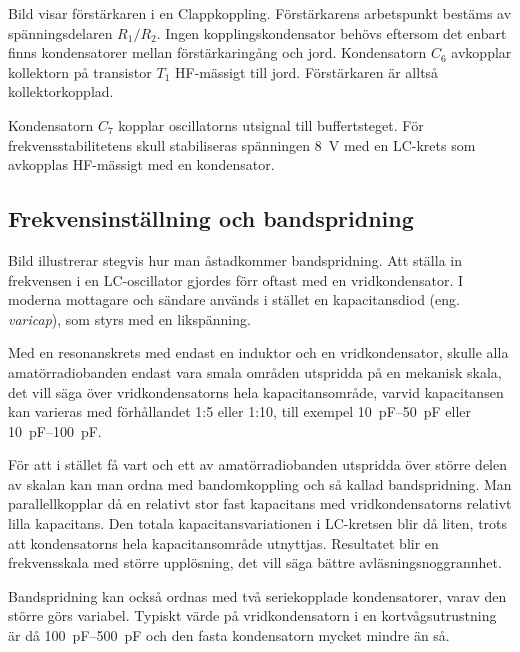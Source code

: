 \newpage
Bild  visar förstärkaren i en Clappkoppling.
Förstärkarens arbetspunkt bestäms av spänningsdelaren \(R_1/R_2\).
Ingen kopplingskondensator behövs eftersom det enbart finns kondensatorer
mellan förstärkaringång och jord.
Kondensatorn \(C_6\) avkopplar kollektorn på transistor \(T_1\) HF-mässigt till
jord.
Förstärkaren är alltså kollektorkopplad.

Kondensatorn \(C_7\) kopplar oscillatorns utsignal till buffertsteget.
För frekvensstabilitetens skull stabiliseras spänningen \qty{8}{\volt} med en
LC-krets som avkopplas HF-mässigt med en kondensator.

\subsection{Frekvensinställning och bandspridning}


Bild  illustrerar stegvis hur man åstadkommer
bandspridning.
Att ställa in frekvensen i en LC-oscillator gjordes förr oftast med en
vridkondensator.
I moderna mottagare och sändare används i stället en kapacitansdiod 
(eng. \emph{varicap}), som styrs med en likspänning.

Med en resonanskrets med endast en induktor och en vridkondensator, skulle
alla amatörradiobanden endast vara smala områden utspridda på en mekanisk
skala, det vill säga över vridkondensatorns hela kapacitansområde, varvid
kapacitansen kan varieras med förhållandet 1:5 eller 1:10, till exempel
\SIrange{10}{50}{\pico\farad} eller \SIrange{10}{100}{\pico\farad}.

För att i stället få vart och ett av amatörradiobanden utspridda över större
delen av skalan kan man ordna med bandomkoppling och så kallad bandspridning.
Man parallellkopplar då en relativt stor fast kapacitans med vridkondensatorns
relativt lilla kapacitans.
Den totala kapacitansvariationen i LC-kretsen blir då liten, trots att
kondensatorns hela kapacitansområde utnyttjas.
Resultatet blir en frekvensskala med större upplösning, det vill säga bättre
avläsningsnoggrannhet.

Bandspridning kan också ordnas med två seriekopplade kondensatorer,
varav den större görs variabel.
Typiskt värde på vridkondensatorn i en kortvågsutrustning är då
\SIrange{100}{500}{\pico\farad} och den fasta kondensatorn mycket mindre än så.
